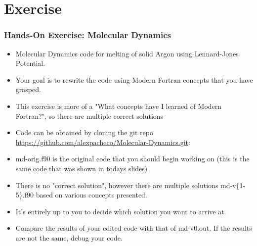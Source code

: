 \documentclass[10pt,t]{beamer}
\begin{document}
\section{Exercise}
\begin{frame}
  \frametitle{\small Hands-On Exercise: Molecular Dynamics}
  \begin{itemize}
    \item Molecular Dynamics code for melting of solid Argon using Lennard-Jones Potential.
    \item Your goal is to rewrite the code using Modern Fortran concepts that you have grasped.
    \item This exercise is more of a "What concepts have I learned of Modern Fortran?", so there are multiple correct solutions
    \item Code can be obtained by cloning the git repo \url{https://github.com/alexpacheco/Molecular-Dynamics.git}:
    \item md-orig.f90 is the original code that you should begin working on (this is the same code that was shown in todays slides)
    \item There is no "correct solution", however there are multiple solutions md-v\{1-5\}.f90 based on various concepts presented.
    \item It's entirely up to you to decide which solution you want to arrive at.
    \item Compare the results of your edited code with that of md-v0.out. If the results are not the same, debug your code.
  \end{itemize}
\end{frame}
\end{document}
